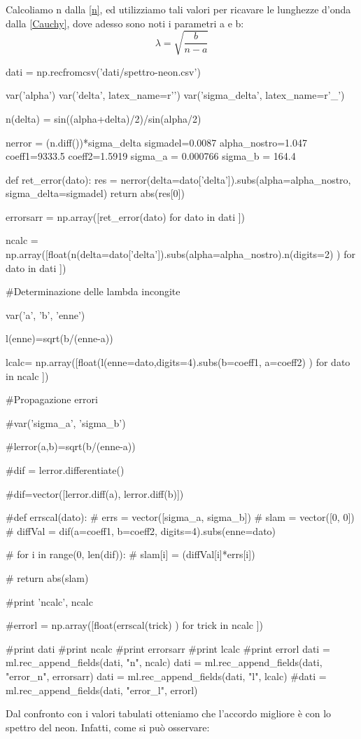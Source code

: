 Calcoliamo n dalla \ref{n}, ed utilizziamo tali valori per ricavare le lunghezze d'onda dalla \ref{Cauchy}, dove adesso sono noti i parametri a e b:
\begin{equation}
\lambda = \sqrt{\frac{b}{n-a}}
\end{equation}




\begin{sagesilent}


dati = np.recfromcsv('dati/spettro-neon.csv')

var('alpha')
var('delta', latex_name=r'\delta')
var('sigma_delta', latex_name=r'\sigma_{\delta}')


n(delta) = sin((alpha+delta)/2)/sin(alpha/2)

nerror = (n.diff())*sigma_delta
sigmadel=0.0087
alpha_nostro=1.047
coeff1=9333.5
coeff2=1.5919
sigma_a = 0.000766
sigma_b = 164.4


def ret_error(dato):
  res = nerror(delta=dato['delta']).subs(alpha=alpha_nostro, sigma_delta=sigmadel)
  return abs(res[0])
  
errorsarr = np.array([ret_error(dato) for dato in dati ])

ncalc = np.array([float(n(delta=dato['delta']).subs(alpha=alpha_nostro).n(digits=2) ) for dato in dati ])

#Determinazione delle lambda incongite

var('a', 'b', 'enne')

l(enne)=sqrt(b/(enne-a))

lcalc= np.array([float(l(enne=dato,digits=4).subs(b=coeff1, a=coeff2)  ) for dato in ncalc ])

#Propagazione errori

#var('sigma_a', 'sigma_b')

#lerror(a,b)=sqrt(b/(enne-a))

#dif = lerror.differentiate()

#dif=vector([lerror.diff(a), lerror.diff(b)])

#def errscal(dato):
 # errs = vector([sigma_a, sigma_b])
 # slam = vector([0, 0])
 # diffVal = dif(a=coeff1, b=coeff2, digits=4).subs(enne=dato)
  
 # for i in range(0, len(dif)):
 #     slam[i] = (diffVal[i]*errs[i])
    
 # return abs(slam)

#print 'ncalc', ncalc

#errorl = np.array([float(errscal(trick) ) for trick in ncalc ])



#print dati
#print ncalc
#print errorsarr
#print lcalc
#print errorl
dati = ml.rec_append_fields(dati, "n", ncalc)
dati = ml.rec_append_fields(dati, "error_n", errorsarr)
dati = ml.rec_append_fields(dati, "l", lcalc)
#dati = ml.rec_append_fields(dati, "error_l", errorl)

\end{sagesilent}

\begin{center}
\end{center}


Dal confronto con i valori tabulati otteniamo che l'accordo migliore è con lo spettro del neon. Infatti, come si può osservare:


